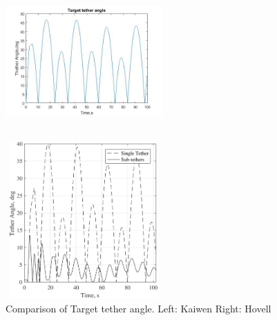 \begin{figure}[htbp]
\centering
\begin{minipage}[t]{0.48\textwidth}
\centering
\includegraphics[width=6cm,height=6cm]{fig/simulation/ThrustStable/Targettetherangle.jpg}
\end{minipage}
\begin{minipage}[t]{0.48\textwidth}
\centering
\includegraphics[width=6cm,height=6cm]{fig/simulation/ThrustStable/Targettetheranglesample.jpg}
\end{minipage}
\caption{Comparison of Target tether angle. Left: Kaiwen	Right: Hovell}
\end{figure}

